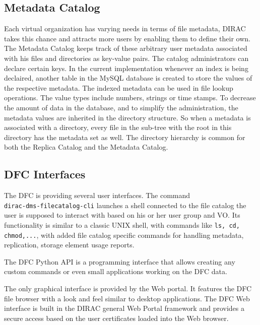 \subsection{Metadata Catalog}

Each virtual organization has varying needs in terms of file metadata, DIRAC takes this chance and 
attracts more users by enabling them to define their own. The Metadata Catalog keeps track of these 
arbitrary user metadata associated with his files and directories as key-value pairs. 
The catalog administrators can declare certain keys. In the current implementation whenever an 
index is being declaired, another table in the MySQL database is created to store the values of the 
respective metadata. The indexed metadata can be used in file lookup operations. The value types include 
numbers, strings or time stamps. To decrease the amount of data in the database, and to simplify the 
administration, the metadata values are inherited in the directory structure. So when a metadata is 
associated with a directory, every file in the sub-tree with the root in this directory has the metadata
set as well. The directory hierarchy is common for both the Replica Catalog and the Metadata Catalog.

\subsection{DFC Interfaces}

The DFC is providing several user interfaces. The command \\ \texttt{dirac-dms-filecatalog-cli} launches a shell
connected to the file catalog the user is supposed to interact with based on his or her user group and VO. Its 
functionality is similar to a classic UNIX shell, with commands like \texttt{ls, cd, chmod,...}, with added 
file catalog specific commands for handling metadata, replication, storage element usage reports.

The DFC Python API is a programming interface that allows creating any custom commands or even
small applications working on the DFC data.

The only graphical interface is provided by the Web portal. It features the DFC file browser
with a look and feel similar to desktop applications. The DFC Web interface is built in the DIRAC 
general Web Portal framework and provides a secure access based on the user certificates loaded into 
the Web browser.
